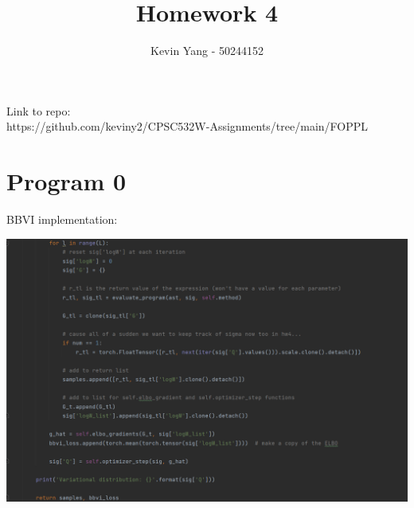 \documentclass[10pt]{homeworg}
\title{Homework 4}
\author{Kevin Yang - 50244152}
\begin{document}
\maketitle

\Huge{Link to repo:}\\
\Large{https://github.com/keviny2/CPSC532W-Assignments/tree/main/FOPPL}

\section{Program 0}
BBVI implementation:
\begin{center}
\includegraphics[scale=0.5]{figures/bbvi.png}
\end{center}

\newpage
\end{document}
